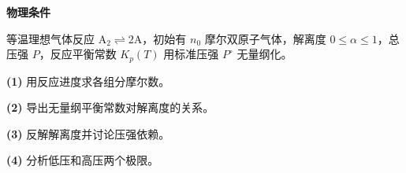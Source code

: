 \textbf{物理条件}\par 等温理想气体反应 \(\mathrm A_2\rightleftharpoons2\mathrm A\)，初始有 \(n_0\) 摩尔双原子气体，解离度 \(0\le\alpha\le1\)，总压强 \(P\)，反应平衡常数 \(K_p(T)\) 用标准压强 \(P^\circ\) 无量纲化。
\par\noindent\textbf{(1)} 用反应进度求各组分摩尔数。
\par\noindent\textbf{(2)} 导出无量纲平衡常数对解离度的关系。
\par\noindent\textbf{(3)} 反解解离度并讨论压强依赖。
\par\noindent\textbf{(4)} 分析低压和高压两个极限。
